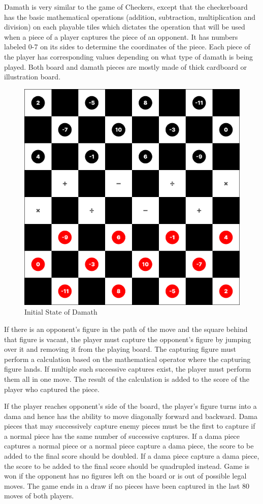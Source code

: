 Damath is very similar to the game of Checkers, except that the checkerboard has the basic mathematical operations (addition, subtraction, multiplication and division) on each playable tiles which dictates the operation that will be used when a piece of a player captures the piece of an opponent. It has numbers labeled 0-7 on its sides to determine the coordinates of the piece. Each piece of the player has corresponding values depending on what type of damath is being played. Both board and damath pieces are mostly made of thick cardboard or illustration board.

\begin{figure}[htb]
     \centering
     \includegraphics[width=0.5\linewidth]{images/initial_state.png}
     \caption{Initial State of Damath}
     \label{fig:initial_state}
\end{figure}
 
If there is an opponent's figure in the path of the move and the square behind that figure is vacant, the player must capture the opponent's figure by jumping over it and removing it from the playing board. The capturing figure must perform a calculation based on the mathematical operator where the capturing figure lands. If multiple such successive captures exist, the player must perform them all in one move. The result of the calculation is added to the score of the player who captured the piece.

If the player reaches opponent’s side of the board, the player's figure turns into a dama and hence has the ability to move diagonally forward and backward. Dama pieces that may successively capture enemy pieces must be the first to capture if a normal piece has the same number of successive captures. If a dama piece captures a normal piece or a normal piece capture a dama piece, the score to be added to the final score should be doubled. If a dama piece capture a dama piece, the score to be added to the final score should be quadrupled instead. Game is won if the opponent has no figures left on the board or is out of possible legal moves. The game ends in a draw if no pieces have been captured in the last 80 moves of both players.
 

